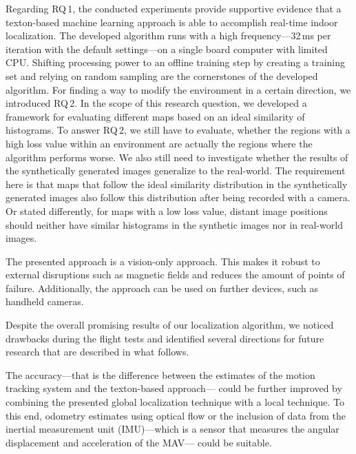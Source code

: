 \documentclass[11pt]{report}
\begin{document}
Regarding RQ\,1, the conducted experiments provide supportive evidence
that a texton-based machine learning approach is able to accomplish
real-time indoor localization.  The developed algorithm runs with a
high frequency---32\,ms per iteration with the default settings---on a
single board computer with limited CPU. Shifting processing power to
an offline training step by creating a training set and relying on
random sampling are the cornerstones of the developed algorithm. For
finding a way to modify the environment in a certain direction, we
introduced RQ\,2. In the scope of this research question, we developed
a framework for evaluating different maps based on an ideal similarity
of histograms. To answer RQ\,2, we still have to evaluate, whether the
regions with a high loss value within an environment are actually the
regions where the algorithm performs worse. We also still need to
investigate whether the results of the synthetically generated images
generalize to the real-world.
The requirement here is that maps that follow the ideal similarity
distribution in the synthetically generated images also follow this
distribution after being recorded with a camera. Or stated
differently, for maps with a low loss value, distant image positions
should neither have similar histograms in the synthetic images nor in
real-world images.

The presented approach is a vision-only approach. This makes it robust
to external disruptions such as magnetic fields and reduces the amount
of points of failure. Additionally, the approach can be used on
further devices, such as handheld cameras.

Despite the overall promising results of our localization algorithm,
we noticed drawbacks during the flight tests and identified several
directions for future research that are described in what follows.

The accuracy---that is the difference between the estimates of the
motion tracking system and the texton-based approach--- could be
further improved by combining the presented global localization
technique with a local technique. To this end, odometry estimates using
optical flow or the inclusion of data from the inertial measurement
unit (IMU)---which is a sensor that measures the angular displacement
and acceleration of the MAV--- could be suitable.
\end{document}
